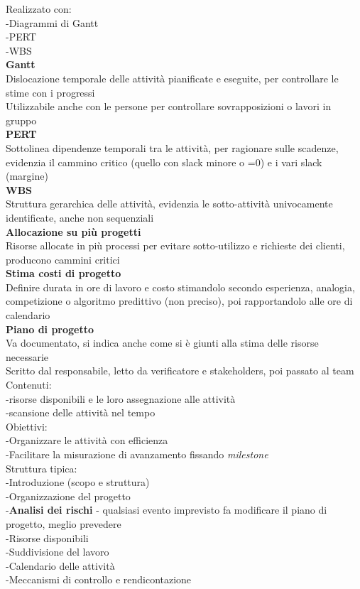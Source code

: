 \documentclass{article}
\begin{document}
			Realizzato con:\\
			-Diagrammi di Gantt\\
			-PERT\\
			-WBS\\
			
			\textbf{Gantt}\\
			Dislocazione temporale delle attività pianificate e eseguite, per controllare le stime con i progressi\\
			Utilizzabile anche con le persone per controllare sovrapposizioni o lavori in gruppo\\
			
			\textbf{PERT}\\
			Sottolinea dipendenze temporali tra le attività, per ragionare sulle scadenze, evidenzia il cammino critico (quello con slack minore o =0) e i vari slack (margine)\\
			
			\textbf{WBS}\\
			Struttura gerarchica delle attività, evidenzia le sotto-attività univocamente identificate, anche non sequenziali\\
			
			\textbf{Allocazione su più progetti}\\
			Risorse allocate in più processi per evitare sotto-utilizzo e richieste dei clienti, producono cammini critici\\
			
			\textbf{Stima costi di progetto}\\
			Definire durata in ore di lavoro e costo stimandolo secondo esperienza, analogia, competizione o algoritmo predittivo (non preciso), poi rapportandolo alle ore di calendario\\
			
			\textbf{Piano di progetto}\\
			Va documentato, si indica anche come si è giunti alla stima delle risorse necessarie\\
			Scritto dal responsabile, letto da verificatore e stakeholders, poi passato al team\\
			Contenuti:\\
			-risorse disponibili e le loro assegnazione alle attività\\
			-scansione delle attività nel tempo\\
			Obiettivi:\\
			-Organizzare le attività con efficienza\\
			-Facilitare la misurazione di avanzamento fissando \textit{milestone}\\
			Struttura tipica:\\
			-Introduzione (scopo e struttura)\\
			-Organizzazione del progetto\\
			-\textbf{Analisi dei rischi} - qualsiasi evento imprevisto fa modificare il piano di progetto, meglio prevedere\\
			-Risorse disponibili\\
			-Suddivisione del lavoro\\
			-Calendario delle attività\\
			-Meccanismi di controllo e rendicontazione\\
			
\end{document}
